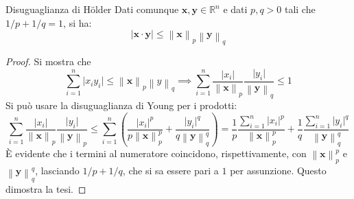 \documentclass[11pt, a4paper]{scrartcl}
\theoremstyle{definition}
\numberwithin{esempio}{section}
\theoremstyle{definition}
\numberwithin{obs}{section}
\numberwithin{nota}{section}
\numberwithin{equation}{subsection}
\begin{document}
\begin{lemma}
	{Disuguaglianza di H\"older}{}
	Dati comunque $\mathbf{x} ,\mathbf{y} \in \mathbb{R}^n$ e dati $p,q>0$ tali che $1 / p + 1 / q = 1$, si ha:
	\[
	\lvert \mathbf{x} \cdot \mathbf{y}  \rvert \le \left\lVert \mathbf{x}  \right\rVert _p \left\lVert \mathbf{y}  \right\rVert _q
	\] 
	\begin{proof}
		Si mostra che
		\[
		\sum_{i=1}^{n} \lvert x_i y_i \rvert \le \left\lVert \mathbf{x}  \right\rVert _p \left\lVert y \right\rVert _q \implies \sum_{i=1}^{n} \frac{\lvert x_i \rvert }{\left\lVert \mathbf{x}  \right\rVert _p} \frac{\lvert y_i \rvert }{\left\lVert \mathbf{y}  \right\rVert _q} \le  1
		\] 
		Si pu\`o usare la disuguaglianza di Young per i prodotti:
		\[
		\sum_{i=1}^{n} \frac{\lvert x_i \rvert }{\left\lVert \mathbf{x}  \right\rVert _p} \frac{\lvert y_i \rvert }{\left\lVert \mathbf{y}  \right\rVert _p} \le \sum_{i=1}^{n} \left(\frac{\lvert x_i \rvert ^p}{p \left\lVert \mathbf{x}  \right\rVert _p^p} + \frac{\lvert y_i \rvert ^q}{q\left\lVert \mathbf{y}  \right\rVert _q^q}\right) =\frac{1}{p} \frac{\sum_{i=1}^{n} \lvert x_i \rvert ^p}{\left\lVert \mathbf{x}  \right\rVert _p^p} + \frac{1}{q}\frac{\sum_{i=1}^{n} \lvert y_i \rvert ^q}{\left\lVert \mathbf{y}  \right\rVert _q^q}
		\] 
		\`E evidente che i termini al numeratore coincidono, rispettivamente, con $\left\lVert \mathbf{x}  \right\rVert _p^p$ e $\left\lVert \mathbf{y}  \right\rVert _q^q$, lasciando $1 /p + 1 / q$, che si sa essere pari a $1 $ per assunzione.
		Questo dimostra la tesi.
	\end{proof}
\end{lemma}
\end{document}
